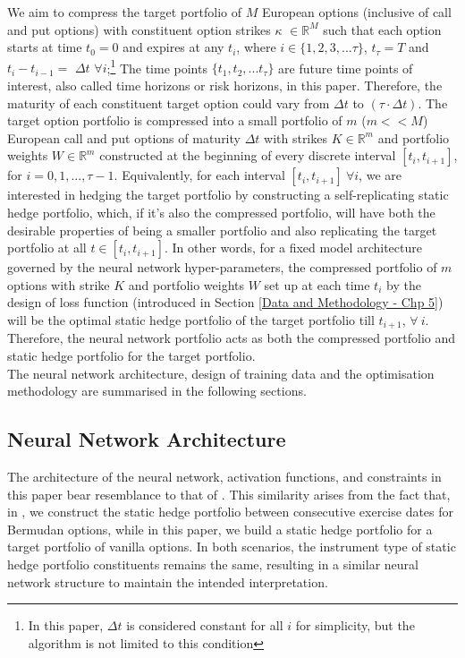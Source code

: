 \noindent We aim to compress the target portfolio of $M$ European options (inclusive of call and put options) with constituent option strikes {\Large $\kappa$} $\in \mathbb{R}^{M}$ such that each option starts at time $t_0=0$ and expires at any $t_{i}$, where $i \in \{1, 2, 3, ... \tau \}$, $t_{\tau} = T$ and $t_{i} - t_{i-1} = $ $\Delta t$  $\forall i$;\footnote{In this paper, $\Delta t$ is considered constant for all $i$ for simplicity, but the algorithm is not limited to this condition} The time points $\{t_1, t_2, ... t_{\tau}\}$ are future time points of interest, also called time horizons or risk horizons, in this paper. Therefore, the maturity of each constituent target option could vary from $\Delta t$ to $(\tau \cdot \Delta t)$. The target option portfolio is compressed into a small portfolio of $m$ ($m << M$) European call and put options of maturity $\Delta t$ with strikes $K \in \mathbb{R}^{m}$ and portfolio weights $W \in \mathbb{R}^{m}$ constructed at the beginning of every discrete interval $[t_{i}, t_{i+1}]$, for $i=0, 1, ..., \tau - 1$. Equivalently, for each interval $[t_{i}, t_{i+1}] \ \forall i$, we are interested in hedging the target portfolio by constructing a self-replicating static hedge portfolio, which, if it's also the compressed portfolio, will have both the desirable properties of being a smaller portfolio and also replicating the target portfolio at all $t \in [t_{i}, t_{i+1}]$. In other words,  for a fixed model architecture governed by the neural network hyper-parameters, the compressed portfolio of $m$ options with strike $K$ and portfolio weights $W$  set up at each time $t_i$ by the design of loss function (introduced in Section \ref{Data and Methodology - Chp 5}) will be the optimal static hedge portfolio of the target portfolio till $t_{i+1}$, $\forall \ i $. Therefore, the neural network portfolio acts as both the compressed portfolio and static hedge portfolio for the target portfolio. \\

\noindent The neural network architecture, design of training data and the optimisation methodology are summarised in the following sections.


\subsection{Neural Network Architecture}

\noindent The architecture of the neural network, activation functions, and constraints in this paper bear resemblance to that of \cite{dhandapani2024bermudan}. This similarity arises from the fact that, in \cite{dhandapani2024bermudan}, we construct the static hedge portfolio between consecutive exercise dates for Bermudan options,  while in this paper, we build a static hedge portfolio for a target portfolio of vanilla options. In both scenarios, the instrument type of static hedge portfolio constituents remains the same, resulting in a similar neural network structure to maintain the intended interpretation. \\

